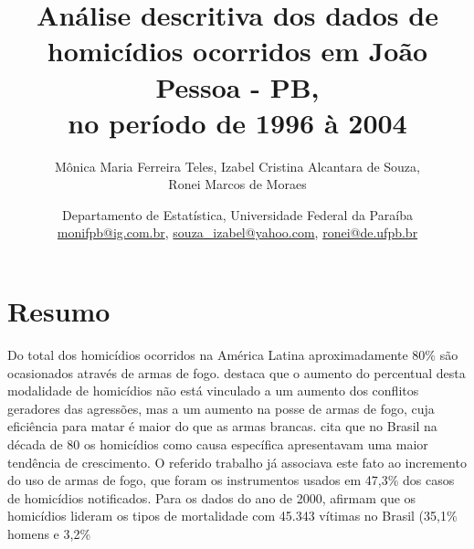 \documentclass[12pt]{article}
\title{Análise descritiva dos dados de homicídios ocorridos em João Pessoa - PB,\\
no período de 1996 à 2004}
\author{Mônica Maria Ferreira Teles, Izabel Cristina Alcantara de Souza,\\
 Ronei Marcos de Moraes}
\date{Departamento de Estatística, Universidade Federal da Paraíba
\url{monifpb@ig.com.br}, \url{souza_izabel@yahoo.com}, \url{ronei@de.ufpb.br}}
\begin{document}
\maketitle
\section*{Resumo}
%
%
%
%
%
%
% 
%
%
%
%
%
Do total dos homicídios ocorridos na América Latina aproximadamente 80\% são ocasionados
através de armas de fogo.  destaca que o aumento do percentual desta
modalidade de homicídios não está vinculado a um aumento dos
conflitos geradores das agressões, mas a um aumento na posse de armas de fogo, cuja
eficiência para matar é maior do que as armas brancas.  cita que no Brasil na
 década de 80 os homicídios como causa
específica apresentavam uma maior tendência de crescimento. O referido trabalho já
associava este fato ao incremento do uso de armas de fogo, que foram os instrumentos usados
em 47,3\% dos casos de homicídios notificados. Para os dados do ano de 2000,  afirmam que os homicídios
lideram os tipos de mortalidade com 45.343 vítimas no Brasil (35,1\% homens e 3,2\%
\end{document}
